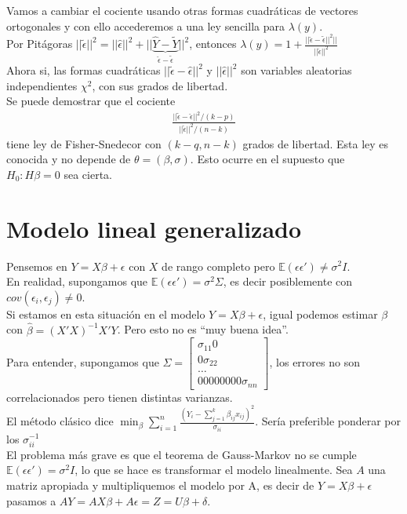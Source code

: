 \documentclass[10pt]{article}
\theoremstyle{plain}
\theoremstyle{definition}
\begin{document}
Vamos a cambiar el cociente usando otras formas cuadráticas de vectores ortogonales y con ello accederemos a una ley sencilla para $\lambda (y)$.\\

Por Pitágoras $||\tilde{\epsilon}||^2 = ||\hat{\epsilon}||^2 + ||\underbrace{\hat{Y}-\tilde{Y}}_{\hat{\epsilon}-\tilde{\epsilon}}||^2$, entonces $\lambda (y) = 1+ \frac{||\hat{\epsilon}-\tilde{\epsilon}||^2||}{||\hat{\epsilon}||^2}$\\

Ahora si, las formas cuadráticas $||\tilde{\epsilon}-\hat{\epsilon}||^2$ y $||\hat{\epsilon}||^2$ son variables aleatorias independientes $\chi^2$, con sus grados de libertad.\\

Se puede demostrar que el cociente
\begin{align*}
\frac{||\tilde{\epsilon}-\hat{\epsilon}||^2/(k-p)}{||\hat{\epsilon}||^2/(n-k)}
\end{align*}
tiene ley de Fisher-Snedecor con $(k-q, n-k)$ grados de libertad. Esta ley es conocida y no depende de $\theta = (\beta, \sigma)$. Esto ocurre en el supuesto que $H_{0}\colon H\beta = 0$ sea cierta.

\section{Modelo lineal generalizado}
Pensemos en $Y=X\beta+\epsilon$ con $X$ de rango completo pero $\mathbb{E}(\epsilon\epsilon') \not = \sigma^2I$.\\
En realidad, supongamos que $\mathbb{E}(\epsilon\epsilon') = \sigma^2 \Sigma$, es decir posiblemente con $cov(\epsilon_{i},\epsilon_{j}) \not = 0$.\\

Si estamos en esta situación en el modelo $Y=X\beta + \epsilon$, igual podemos estimar $\beta$ con $\hat{\beta} = (X'X)^{-1}X'Y$. Pero esto no es ``muy buena idea''.\\

Para entender, supongamos que $\Sigma = \begin{bmatrix}
\sigma_{11} 0 \\ 0 \sigma_{22} \\ \ldots \\ 00000000 \sigma_{nn}
\end{bmatrix}$, los errores no son correlacionados pero tienen distintas varianzas.\\

El método clásico dice $\min_{\beta} \sum_{i=1}^{n} \frac{(Y_{i}-\sum_{j=1}^k \beta_{ij} x_{ij})^2}{\sigma_{ii}}$. Sería preferible ponderar por los $\sigma_{ii}^{-1}$\\
El problema más grave es que el teorema de Gauss-Markov no se cumple $\mathbb{E}(\epsilon\epsilon') = \sigma^2I$, lo que se hace es transformar el modelo linealmente. Sea $A$ una matriz apropiada y multipliquemos el modelo por A, es decir de $Y=X\beta+\epsilon$ pasamos a $AY = AX\beta + A\epsilon = Z = U\beta + \delta$.\\
\end{document}

